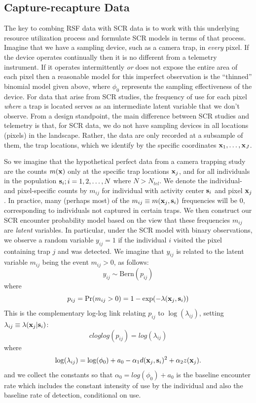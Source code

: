 \documentclass[12pt]{article}
\begin{document}
\subsection{Capture-recapture Data}

The key to combing RSF data with SCR data is to work with this
underlying resource utilization process and formulate SCR models in
terms of that process.  Imagine that we have a sampling device, such
as a camera trap, in {\it every} pixel. If the device operates
continually then it is no different from a telemetry instrument.  If
it operates intermittently {\it or} does not expose the entire area of
each pixel then a reasonable model for this imperfect observation is
the ``thinned'' binomial model given above, where $\phi_{0}$
represents the sampling effectiveness of the device.  For data that
arise from SCR studies, the frequency of use for each pixel {\it where}
  a trap is located serves as an intermediate latent variable that we
don't observe. From a design standpoint, the main difference between
SCR studies and telemetry is that, for SCR data, we do not have
sampling devices in all locations (pixels) in the landscape. Rather,
the data are only recorded at a subsample of them, the trap locations,
which we identify by the specific coordinates ${\bf x}_{1},\ldots,{\bf
  x}_{J}$.

So we imagine
that the hypothetical perfect data from a camera trapping study are
the counts $m({\bf x})$ only at the specific trap locations
${\bf x}_{j}$, and for all individuals in the population ${\bf s}_{i};
i=1,2,\ldots,N$ where $N> N_{tel}$. We denote the individual- and
pixel-specific counts by $m_{ij}$ for individual with activity center
${\bf s}_{i}$ and pixel ${\bf x}_{j}$.
 In practice, many (perhaps most)
of the $m_{ij} \equiv m({\bf x}_{j},{\bf s}_{i})$ frequencies will be 0,
corresponding to individuals not captured in certain traps.
We then construct our SCR encounter
probability model based on the
view that these frequencies $m_{ij}$ are {\it latent} variables. In particular,
under the SCR model with binary observations,
 we observe a random variable
$y_{ij} = 1$  if the individual $i$ visited the pixel
containing trap $j$ and was detected.
We imagine that $y_{ij}$ is related to the latent variable $m_{ij}$ being the
event $m_{ij}>0$, as follows:
\[
 y_{ij} \sim \mbox{Bern}(p_{ij})
\]
where
\[
 p_{ij} = \Pr(m_{ij}>0) =  1-\exp(- \lambda({\bf x}_{j},{\bf s}_{i}))
\]
This is the complementary log-log link relating
$p_{ij}$ to $\log(\lambda_{ij})$, setting
$\lambda_{ij} \equiv \lambda({\bf x}_{j}|{\bf s}_{i})$:
\[
 cloglog(p_{ij}) = log(\lambda_{ij})
\]
where
\[
 \log(\lambda_{ij} ) = \log(\phi_{0}) + a_{0} -\alpha_{1} d({\bf
   x}_{j},{\bf s}_{i})^{2} +  \alpha_{2} z({\bf x}_{j}).
\]
and we collect the constants so that $\alpha_{0} = log(\phi_{0}) +
a_{0}$ is the
 baseline encounter rate which includes
the constant intensity of use by the individual and also the baseline
rate of detection, conditional on use.
\end{document}
